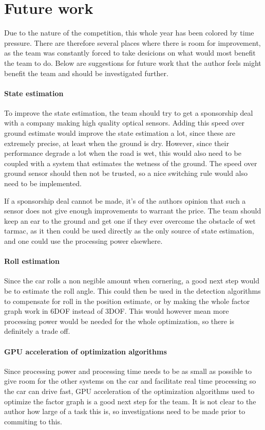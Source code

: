 \chapter{Future work}
Due to the nature of the competition, this whole year has been colored by time pressure. There are therefore several places where there is room for improvement, as the team was constantly forced to take desicions on what would most benefit the team to do. Below are suggestions for future work that the author feels might benefit the team and should be investigated further.

\subsubsection{State estimation}
To improve the state estimation, the team should try to get a sponsorship deal with a company making high quality optical sensors. Adding this speed over ground estimate would improve the state estimation a lot, since these are extremely precise, at least when the ground is dry. However, since their performance degrade a lot when the road is wet, this would also need to be coupled with a system that estimates the wetness of the ground. The speed over ground sensor should then not be trusted, so a nice switching rule would also need to be implemented. 

If a sponsorship deal cannot be made, it's of the authors opinion that such a sensor does not give enough improvements to warrant the price. The team should keep an ear to the ground and get one if they ever overcome the obstacle of wet tarmac, as it then could be used directly as the only source of state estimation, and one could use the processing power elsewhere.

\subsubsection{Roll estimation}
Since the car rolls a non negible amount when cornering, a good next step would be to estimate the roll angle. This could then be used in the detection algorithms to compensate for roll in the position estimate, or by making the whole factor graph work in 6DOF instead of 3DOF. This would however mean more processing power would be needed for the whole optimization, so there is definitely a trade off.

\subsubsection{GPU acceleration of optimization algorithms}
Since processing power and processing time needs to be as small as possible to give room for the other systems on the car and facilitate real time processing so the car can drive fast, GPU acceleration of the optimization algorithms used to optimize the factor graph is a good next step for the team. It is not clear to the author how large of a task this is, so investigations need to be made prior to commiting to this.

